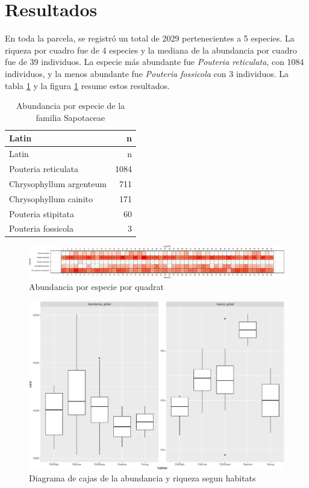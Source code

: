 \documentclass[11pt,]{article}
\begin{document}
\section{Resultados}\label{resultados}

En toda la parcela, se registró un total de 2029 pertenecientes a 5
especies. La riqueza por cuadro fue de 4 especies y la mediana de la
abundancia por cuadro fue de 39 individuos. La especie más abundante fue
\emph{Pouteria reticulata}, con 1084 individuos, y la menos abundante
fue \emph{Pouteria fossicola} con 3 individuos. La tabla
\ref{tab:abun_sp} y la figura \ref{fig:abun_sp_q} resume estos
resultados.

\begin{longtable}[]{@{}lr@{}}
\caption{\label{tab:abun_sp}Abundancia por especie de la familia
Sapotaceae}\tabularnewline
\toprule
Latin & n\tabularnewline
\midrule
\endfirsthead
\toprule
Latin & n\tabularnewline
\midrule
\endhead
Pouteria reticulata & 1084\tabularnewline
Chrysophyllum argenteum & 711\tabularnewline
Chrysophyllum cainito & 171\tabularnewline
Pouteria stipitata & 60\tabularnewline
Pouteria fossicola & 3\tabularnewline
\bottomrule
\end{longtable}

\begin{figure}
\centering
\includegraphics{manuscrito_files/figure-latex/unnamed-chunk-3-1.pdf}
\caption{\label{fig:abun_sp_q}Abundancia por especie por quadrat}
\end{figure}

\begin{figure}
\centering
\includegraphics{manuscrito_files/figure-latex/unnamed-chunk-4-1.pdf}
\caption{\label{fig:P13}Diagrama de cajas de la abundancia y riqueza
segun habitats}
\end{figure}
\end{document}
